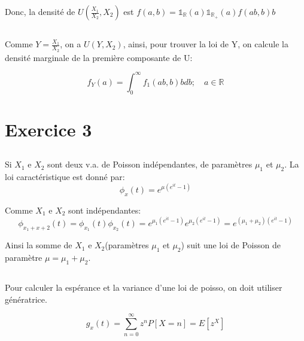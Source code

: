 \documentclass[a4paper]{article}
\begin{document}
Donc, la densité de $U(\frac{X_1}{X_2},X_2)$ est $f(a,b)=\mathds{1}_\mathbb{R}(a)\mathds{1}_{\mathbb{R}_+}(a)f(ab,b)b$

\subsection{}

Comme $Y=\frac{X_1}{X_2}$, on a $U(Y,X_2)$, ainsi,  pour trouver la loi de Y, on
calcule la densité marginale de la première composante de U:

\begin{equation}
f_Y(a)=\int_0^\infty f_1(ab,b)bdb ; \quad a \in \mathbb{R}
\end{equation}


\section{Exercice 3}

\subsection{}
Si $X_1$ e $X_2$ sont deux  v.a. de Poisson indépendantes, de paramètres $\mu_1$
et $\mu_2$. La loi caractéristique est donné par:
\begin{equation}
  \phi_x(t)=e^{\mu(e^{it}-1)}
\end{equation}

Comme $X_1$ e $X_2$ sont indépendantes:
\begin{equation}
  \phi_{x_1+x+2}(t)=\phi_{x_1}(t)\phi_{x_2}(t)=e^{\mu_1(e^{it}-1)}e^{\mu_2(e^{it}-1)}=
  e^{(\mu_1+\mu_2)(e^{it}-1)}
\end{equation}

Ainsi la somme  de $X_1$ e $X_2$(paramètres $\mu_1$ et $\mu_2$)  suit une loi de
Poisson de paramètre $\mu=\mu_1+\mu_2$.

\subsection{}
Pour calculer la espérance et la  variance d'une loi de poisso, on doit utiliser
génératrice.

\begin{equation}
  g_x(t)=\sum_{n=0}^{\infty}z^nP[X=n]=E[z^X]
\end{equation}
\end{document}
